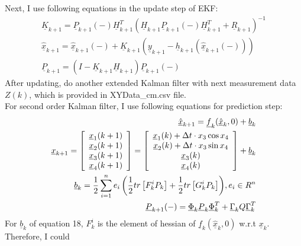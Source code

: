 \documentclass{article}
\begin{document}
Next, I use following equations in the update step of EKF:
\begin{eqnarray}
	\underline{K}_{k + 1}  = \underline{P}_{k + 1} ( - )\underline{H}_{k + 1}^T (\underline{H}_{k + 1} \underline{P}_{k+ 1} ( - )\underline{H}_{k + 1}^T  + \underline{R}_{k + 1} )^{ - 1} \\
	\underline{\hat{x}}_{k + 1}  = \underline{\hat{x}}_{k + 1} ( - ) + \underline{K}_{k + 1} (\underline{y}_{k + 1}  - \underline{h}_{k + 1} (\underline{\hat{x}}_{k + 1} ( - )))\\
	\underline{P}_{k + 1}  = (I - \underline{K}_{k + 1} \underline{H}_{k + 1} )\underline{P}_{k + 1} ( - )
\end{eqnarray}
After updating, do another extended Kalman filter with next measurement data $Z(k)$, which is provided in XYData\_cm.csv file.\\
For second order Kalman filter, I use following equations for prediction step:
\begin{eqnarray}
	\underline{\hat{x}}_{k + 1}  = \underline{f}_k (\underline{\hat{x}}_k ,0) + \underline{b}_k\\
	\underline{x}_{k + 1}  = \left[ {\begin{array}{*{20}c}
	   {\underline{x}_1 (k + 1)}  \\
	   {\underline{x}_2 (k + 1)}  \\
	   {\underline{x}_3 (k + 1)}  \\
	   {\underline{x}_4 (k + 1)}  \\
	\end{array}} \right] = \left[ {\begin{array}{*{20}c}
	   {\underline{x}_1 (k) + \Delta t \cdot x_3 \cos x_4 }  \\
	   {\underline{x}_2 (k) + \Delta t \cdot x_3 \sin x_4 }  \\
	   {\underline{x}_3 (k)}  \\
	   {\underline{x}_4 (k)}  \\
	\end{array}} \right] + \underline{b}_k \\
	\underline{b}_k  = \frac{1}{2}\sum\limits_{i = 1}^n {e_i \left( {\frac{1}{2}tr\left[ {F_k^i P_k } \right] + \frac{1}{2}tr\left[ {G_k^i P_k } \right]} \right)} ,e_i  \in R^n\\ 
	\underline{P}_{k + 1} ( - ) = \underline{\Phi}_k \underline{P}_k \underline{\Phi}_k^T + \underline{\Gamma}_k Q \underline{\Gamma}_k^T
\end{eqnarray}
For $\underline{b}_k$ of equation 18, $F_k^i$ is the element of hessian of $\underline{f}_k(\underline{\hat{x}}_k, 0)$ w.r.t $\underline{x}_k$. Therefore, I could 
\end{document}
